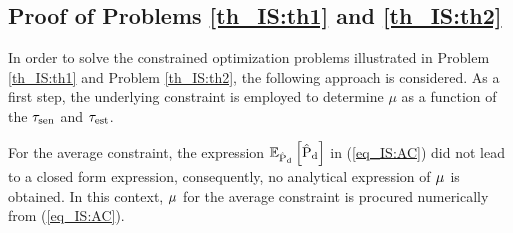 {\subsection{Proof of Problems \ref{th_IS:th1} and \ref{th_IS:th2}} \label{ssec:th1} 
\begin{IEEEproof} 
In order to solve the constrained optimization problems illustrated in Problem \ref{th_IS:th1} and Problem \ref{th_IS:th2}, the following approach is considered. As a first step, the underlying constraint is employed to determine $\mu$ as a function of the $\tau_{\text{sen}}$ and $\tau_{\text{est}}$. %

For the average constraint, the expression ${\mathbb E}_{\hat{\text{P}}_{\text{d}}}\left[ \hat{\text{P}}_{\text{d}} \right]$ in (\ref{eq_IS:AC}) did not lead to a closed form expression, consequently, no analytical expression of $\mu^{\text{}}$ is obtained. In this context, $\mu^{\text{}}$ for the average constraint is procured numerically from (\ref{eq_IS:AC}). 


\end{IEEEproof}}
